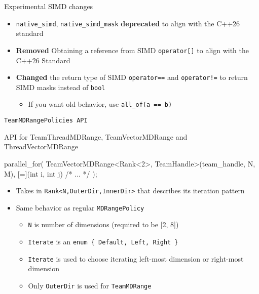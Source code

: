 \begin{frame}[fragile]{Experimental SIMD changes}
  \begin{itemize}
    \item \texttt{native\_simd}, \texttt{native\_simd\_mask} \textbf{deprecated} to align with the C++26 standard
    \item \textbf{Removed} Obtaining a reference from SIMD \texttt{operator[]} to align with the C++26 Standard
    \item \textbf{Changed} the return type of SIMD \texttt{operator==} and \texttt{operator!=} to return SIMD masks instead of \texttt{bool}
    \begin{itemize}
      \item If you want old behavior, use \texttt{all\_of(a == b)}
    \end{itemize}
  \end{itemize}
\end{frame}

\begin{frame}[fragile]{\texttt{TeamMDRangePolicies API}}

API for TeamThreadMDRange, TeamVectorMDRange and ThreadVectorMDRange

\vspace{10pt}

\begin{code}[keywords={TeamVectorMDRange}]
 parallel_for(
   TeamVectorMDRange<Rank<2>, TeamHandle>(team_handle, N, M),
   [=](int i, int j) { /* ... */ }
 );
\end{code}

\vspace{10pt}

\begin{itemize}
  \item Takes in \texttt{Rank<N,OuterDir,InnerDir>} that describes its iteration pattern
  \item Same behavior as regular \texttt{MDRangePolicy}
  \begin{itemize}
    \item \texttt{N} is number of dimensions (required to be [2, 8])
    \item \texttt{Iterate} is an \texttt{enum \{ Default, Left, Right \}}
    \item \texttt{Iterate} is used to choose iterating left-most dimension or right-most dimension
    \item Only \texttt{OuterDir} is used for \texttt{TeamMDRange}
  \end{itemize}
\end{itemize}
\end{frame}


